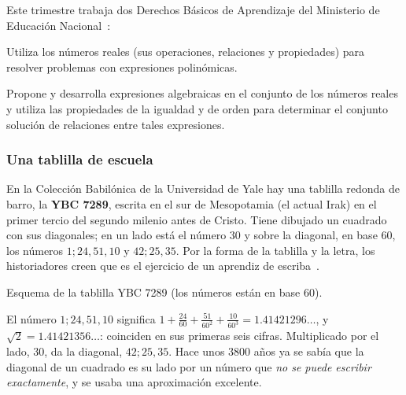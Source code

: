 \documentclass[11pt]{article}
\begin{document}
Este trimestre trabaja dos Derechos Básicos de Aprendizaje del Ministerio de
Educación Nacional~\cite{mendba}:

\begin{dba}
Utiliza los números reales (sus operaciones, relaciones y propiedades) para
resolver problemas con expresiones polinómicas.
\end{dba}

\begin{dba}
Propone y desarrolla expresiones algebraicas en el conjunto de los números
reales y utiliza las propiedades de la igualdad y de orden para determinar
el conjunto solución de relaciones entre tales expresiones.
\end{dba}


\subsubsection*{Una tablilla de escuela}

En la Colección Babilónica de la Universidad de Yale hay una tablilla
redonda de barro, la \textbf{YBC 7289}, escrita en el sur de Mesopotamia (el
actual Irak) en el primer tercio del segundo milenio antes de Cristo. Tiene
dibujado un cuadrado con sus diagonales; en un lado está el número $30$ y
sobre la diagonal, en base $60$, los números $1;24,51,10$ y $42;25,35$. Por la
forma de la tablilla y la letra, los historiadores creen que es el ejercicio
de un aprendiz de escriba~\cite{fowler}.

\begin{center}

{\small Esquema de la tablilla YBC 7289 (los números están en base 60).}
\end{center}

El número $1;24,51,10$ significa
$1 + \frac{24}{60} + \frac{51}{60^2} + \frac{10}{60^3} = \num{1,41421296}\ldots$,
y $\sqrt{2} = \num{1,41421356}\ldots$: coinciden en sus primeras seis cifras.
Multiplicado por el lado, $30$, da la diagonal, $42;25,35$. Hace unos
3800 años ya se sabía que la diagonal de un cuadrado es su lado por un número
que \emph{no se puede escribir exactamente}, y se usaba una aproximación
excelente.
\end{document}
